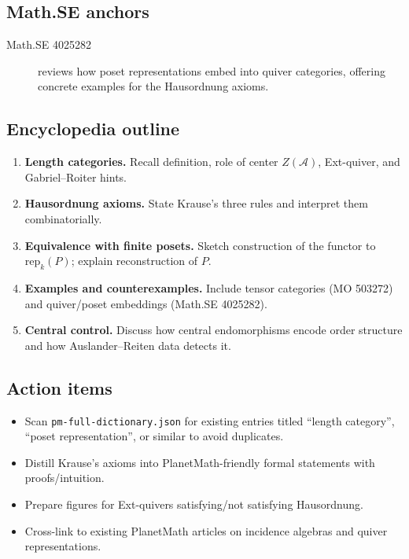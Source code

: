 \subsection*{Math.SE anchors}
\begin{description}
  \item[Math.SE 4025282] reviews how poset representations embed into quiver categories, offering concrete examples for the Hausordnung axioms.
\end{description}
\subsection*{Encyclopedia outline}
\begin{enumerate}
  \item \textbf{Length categories.} Recall definition, role of center $Z(\mathcal{A})$, Ext-quiver, and Gabriel--Roiter hints.
  \item \textbf{Hausordnung axioms.} State Krause's three rules and interpret them combinatorially.
  \item \textbf{Equivalence with finite posets.} Sketch construction of the functor to $\mathrm{rep}_k(P)$; explain reconstruction of $P$.
  \item \textbf{Examples and counterexamples.} Include tensor categories (MO 503272) and quiver/poset embeddings (Math.SE 4025282).
  \item \textbf{Central control.} Discuss how central endomorphisms encode order structure and how Auslander--Reiten data detects it.
\end{enumerate}
\subsection*{Action items}
\begin{itemize}
  \item Scan \texttt{pm-full-dictionary.json} for existing entries titled ``length category'', ``poset representation'', or similar to avoid duplicates.
  \item Distill Krause's axioms into PlanetMath-friendly formal statements with proofs/intuition.
  \item Prepare figures for Ext-quivers satisfying/not satisfying Hausordnung.
  \item Cross-link to existing PlanetMath articles on incidence algebras and quiver representations.
\end{itemize}

